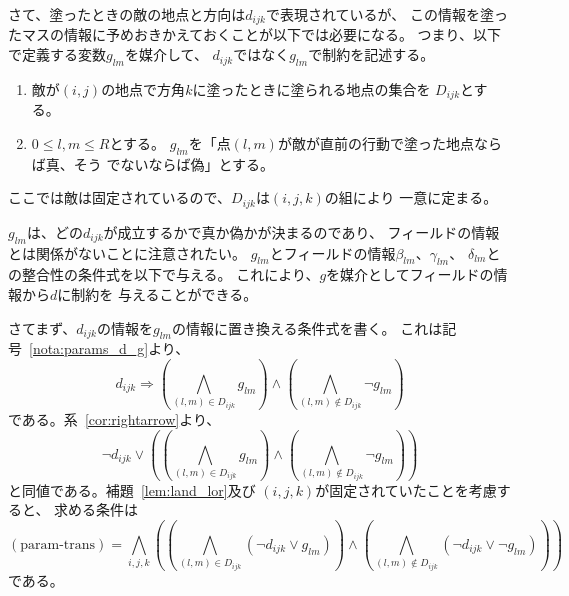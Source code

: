 さて、塗ったときの敵の地点と方向は$d_{ijk}$で表現されているが、
この情報を塗ったマスの情報に予めおきかえておくことが以下では必要になる。
つまり、以下で定義する変数$g_{lm}$を媒介して、
$d_{ijk}$ではなく$g_{lm}$で制約を記述する。

\begin{nota}[塗った地点の情報を媒介する変数] \label{nota:params_d_g}
 \begin{enumerate}[1.]
  \item 敵が$(i, j)$の地点で方角$k$に塗ったときに塗られる地点の集合を
        $D_{ijk}$とする。
  \item $0 \leq l, m \leq R$とする。
        $g_{lm}$を「点$(l, m)$が敵が直前の行動で塗った地点ならば真、そう
        でないならば偽」とする。
 \end{enumerate}
\end{nota}

\begin{rem}
 ここでは敵は固定されているので、$D_{ijk}$は$(i, j, k)$の組により
 一意に定まる。
\end{rem}

\begin{rem} 
 $g_{lm}$は、どの$d_{ijk}$が成立するかで真か偽かが決まるのであり、
 フィールドの情報とは関係がないことに注意されたい。
 $g_{lm}$とフィールドの情報$\beta_{lm}$、$\gamma_{lm}$、
 $\delta_{lm}$との整合性の条件式を以下で与える。
 これにより、$g$を媒介としてフィールドの情報から$d$に制約を
 与えることができる。
\end{rem}

さてまず、$d_{ijk}$の情報を$g_{lm}$の情報に置き換える条件式を書く。
これは記号~\ref{nota:params_d_g}より、
\[
 d_{ijk} \Rightarrow \left( \bigwedge_{(l, m) \in D_{ijk}} g_{lm} \right)
 \land \left( \bigwedge_{(l, m) \not\in D_{ijk}} \lnot g_{lm} \right)
\]
である。系~\ref{cor:rightarrow}より、
\[
 \lnot d_{ijk} \lor 
 \left(
 \left( \bigwedge_{(l, m) \in D_{ijk}} g_{lm} \right)
 \land \left( \bigwedge_{(l, m) \not\in D_{ijk}} \lnot g_{lm} \right)
 \right)
\]
と同値である。補題~\ref{lem:land_lor}及び
$(i, j, k)$が固定されていたことを考慮すると、
求める条件は
\begin{equation}
 (\text{param-trans}) = \bigwedge_{i, j, k} \left(
                            \left( \bigwedge_{(l, m) \in D_{ijk}}
                             (\lnot d_{ijk} \lor g_{lm}) \right)
                            \land
                            \left( \bigwedge_{(l, m) \not\in D_{ijk}}
                             (\lnot d_{ijk} \lor \lnot g_{lm}) \right)
                           \right)
\end{equation}
である。

